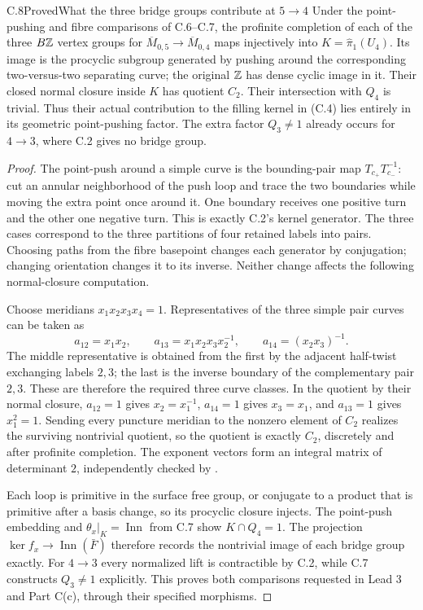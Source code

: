 \begin{result}{C.8}{Proved}{What the three bridge groups contribute at $5\to4$}
Under the point-pushing and fibre comparisons of C.6--C.7, the profinite completion of each of the three $B\mathbb Z$ vertex groups for $\overline M_{0,5}\to\overline M_{0,4}$ maps injectively into $K=\widehat\pi_1(U_4)$. Its image is the procyclic subgroup generated by pushing around the corresponding two-versus-two separating curve; the original $\mathbb Z$ has dense cyclic image in it. Their closed normal closure inside $K$ has quotient $C_2$. Their intersection with $Q_4$ is trivial. Thus their actual contribution to the filling kernel in (C.4) lies entirely in its geometric point-pushing factor. The extra factor $Q_3\ne1$ already occurs for $4\to3$, where C.2 gives no bridge group.
\end{result}
\begin{proof}
The point-push around a simple curve is the bounding-pair map $T_{c_+}T_{c_-}^{-1}$: cut an annular neighborhood of the push loop and trace the two boundaries while moving the extra point once around it. One boundary receives one positive turn and the other one negative turn. This is exactly C.2's kernel generator. The three cases correspond to the three partitions of four retained labels into pairs. Choosing paths from the fibre basepoint changes each generator by conjugation; changing orientation changes it to its inverse. Neither change affects the following normal-closure computation.

Choose meridians $x_1x_2x_3x_4=1$. Representatives of the three simple pair curves can be taken as
\[
 a_{12}=x_1x_2,\qquad
 a_{13}=x_1x_2x_3x_2^{-1},\qquad
 a_{14}=(x_2x_3)^{-1}.
\]
The middle representative is obtained from the first by the adjacent half-twist exchanging labels $2,3$; the last is the inverse boundary of the complementary pair $2,3$. These are therefore the required three curve classes. In the quotient by their normal closure, $a_{12}=1$ gives $x_2=x_1^{-1}$, $a_{14}=1$ gives $x_3=x_1$, and $a_{13}=1$ gives $x_1^2=1$. Sending every puncture meridian to the nonzero element of $C_2$ realizes the surviving nontrivial quotient, so the quotient is exactly $C_2$, discretely and after profinite completion. The exponent vectors form an integral matrix of determinant $2$, independently checked by .

Each loop is primitive in the surface free group, or conjugate to a product that is primitive after a basis change, so its procyclic closure injects. The point-push embedding and $\theta_x|_K=\operatorname{Inn}$ from C.7 show $K\cap Q_4=1$. The projection $\ker f_x\to\operatorname{Inn}(\bar F)$ therefore records the nontrivial image of each bridge group exactly. For $4\to3$ every normalized lift is contractible by C.2, while C.7 constructs $Q_3\ne1$ explicitly. This proves both comparisons requested in Lead 3 and Part C(c), through their specified morphisms.
\end{proof}


